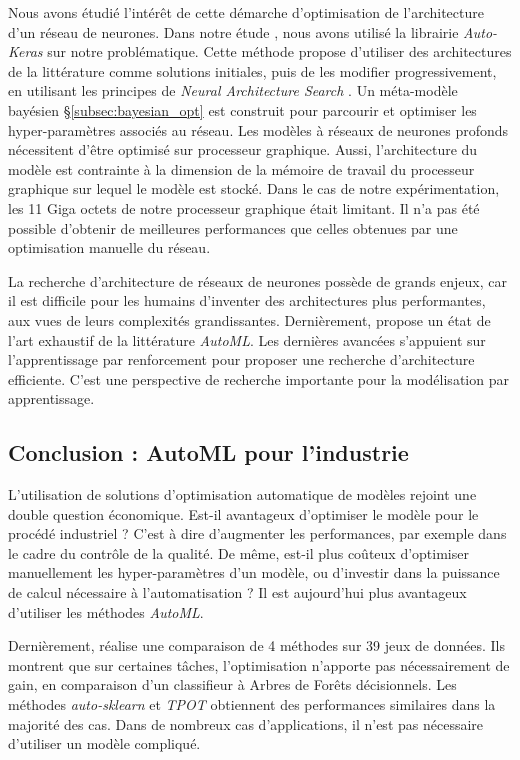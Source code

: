 Nous avons étudié l'intérêt de cette démarche d'optimisation de l'architecture d'un réseau de neurones.
Dans notre étude \cite{nagorny_polarimetric_2019}, nous avons utilisé la librairie \textit{Auto-Keras} \cite{jin_autokeras_2018} sur notre problématique.
Cette méthode propose d'utiliser des architectures de la littérature comme solutions initiales, puis de les modifier progressivement, en utilisant les principes de \textit{Neural Architecture Search} \cite{zoph_neural_2016}.
Un méta-modèle bayésien §\ref{subsec:bayesian_opt} est construit pour parcourir et optimiser les hyper-paramètres associés au réseau.
Les modèles à réseaux de neurones profonds nécessitent d'être optimisé sur processeur graphique.
Aussi, l'architecture du modèle est contrainte à la dimension de la mémoire de travail du processeur graphique sur lequel le modèle est stocké.
Dans le cas de notre expérimentation, les 11 Giga octets de notre processeur graphique était limitant.
Il n'a pas été possible d'obtenir de meilleures performances que celles obtenues par une optimisation manuelle du réseau.

La recherche d'architecture de réseaux de neurones possède de grands enjeux, car il est difficile pour les humains d'inventer des architectures plus performantes, aux vues de leurs complexités grandissantes.
Dernièrement, \cite{elsken_neural_2018} propose un état de l'art exhaustif de la littérature \textit{AutoML}.
Les dernières avancées s'appuient sur l'apprentissage par renforcement pour proposer une recherche d'architecture efficiente.
C'est une perspective de recherche importante pour la modélisation par apprentissage.

\subsection{Conclusion : AutoML pour l'industrie}
L'utilisation de solutions d'optimisation automatique de modèles rejoint une double question économique.
Est-il avantageux d'optimiser le modèle pour le procédé industriel ? C'est à dire d'augmenter les performances, par exemple dans le cadre du contrôle de la qualité.
De même, est-il plus coûteux d'optimiser manuellement les hyper-paramètres d'un modèle, ou d'investir dans la puissance de calcul nécessaire à l'automatisation ?
Il est aujourd'hui plus avantageux d'utiliser les méthodes \textit{AutoML}.

Dernièrement, \citeauthor{gijsbers_open_2019} \cite{gijsbers_open_2019} réalise une comparaison de 4 méthodes sur 39 jeux de données.
Ils montrent que sur certaines tâches, l'optimisation n'apporte pas nécessairement de gain, en comparaison d'un classifieur à Arbres de Forêts décisionnels.
Les méthodes \textit{auto-sklearn} et \textit{TPOT} obtiennent des performances similaires dans la majorité des cas.
Dans de nombreux cas d'applications, il n'est pas nécessaire d'utiliser un modèle compliqué.

